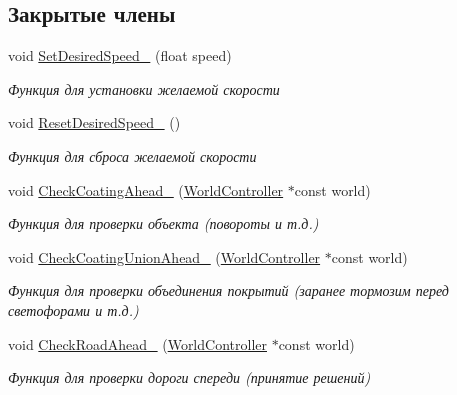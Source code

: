\subsection*{Закрытые члены}
\begin{DoxyCompactItemize}
\item 
\mbox{\label{classrtm_1_1_car_object_a7b2f6f775bca42de1f8a171967ef4a5b}} 
void \hyperlink{classrtm_1_1_car_object_a7b2f6f775bca42de1f8a171967ef4a5b}{Set\+Desired\+Speed\+\_\+} (float speed)
\begin{DoxyCompactList}\small\item\em Функция для установки желаемой скорости \end{DoxyCompactList}\item 
\mbox{\label{classrtm_1_1_car_object_ac7d862334533fc10e079cec616f1c143}} 
void \hyperlink{classrtm_1_1_car_object_ac7d862334533fc10e079cec616f1c143}{Reset\+Desired\+Speed\+\_\+} ()
\begin{DoxyCompactList}\small\item\em Функция для сброса желаемой скорости \end{DoxyCompactList}\item 
void \hyperlink{classrtm_1_1_car_object_a9e80c9029d84c425b43d6a0559d0c76c}{Check\+Coating\+Ahead\+\_\+} (\hyperlink{classrtm_1_1_world_controller}{World\+Controller} $\ast$const world)
\begin{DoxyCompactList}\small\item\em Функция для проверки объекта (повороты и т.\+д.) \end{DoxyCompactList}\item 
void \hyperlink{classrtm_1_1_car_object_a0cd1f15e3b28edde4271b92da250339f}{Check\+Coating\+Union\+Ahead\+\_\+} (\hyperlink{classrtm_1_1_world_controller}{World\+Controller} $\ast$const world)
\begin{DoxyCompactList}\small\item\em Функция для проверки объединения покрытий (заранее тормозим перед светофорами и т.\+д.) \end{DoxyCompactList}\item 
void \hyperlink{classrtm_1_1_car_object_a8d8a11c484ce1afd532b78688345f314}{Check\+Road\+Ahead\+\_\+} (\hyperlink{classrtm_1_1_world_controller}{World\+Controller} $\ast$const world)
\begin{DoxyCompactList}\small\item\em Функция для проверки дороги спереди (принятие решений) \end{DoxyCompactList}\end{DoxyCompactItemize}
